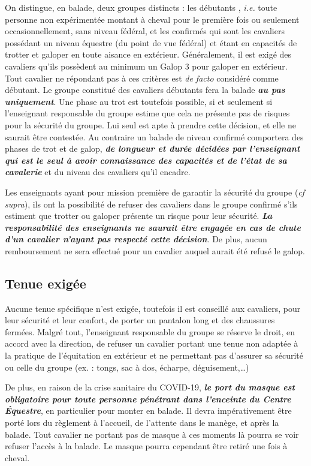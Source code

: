 \documentclass[11pt,a4paper]{article}
\renewcommand{\emph}[1]{\textit{\textbf{#1}}}
\begin{document}
On distingue, en balade, deux groupes distincts : les \og débutants \fg{}, \textit{i.e.} toute personne non expérimentée montant à cheval pour le première fois ou seulement occasionnellement, sans niveau fédéral, et les \og confirmés \fg{} qui sont les cavaliers possédant un niveau équestre (du point de vue fédéral) et étant en capacités de trotter et galoper en toute aisance en extérieur. Généralement, il est exigé des cavaliers qu'ils possèdent au minimum un Galop 3 pour galoper en extérieur. Tout cavalier ne répondant pas à ces critères est \textit{de facto} considéré comme débutant. Le groupe constitué des cavaliers débutants fera la balade \emph{au pas uniquement}. Une phase au trot est toutefois possible, si et seulement si l'enseignant responsable du groupe estime que cela ne présente pas de risques pour la sécurité du groupe. Lui seul est apte à prendre cette décision, et elle ne saurait être contestée. Au contraire un balade de niveau confirmé comportera des phases de trot et de galop, \emph{de longueur et durée décidées par l'enseignant qui est le seul à avoir connaissance des capacités et de l'état de sa cavalerie} et du niveau des cavaliers qu'il encadre.

Les enseignants ayant pour mission première de garantir la sécurité du groupe (\textit{cf supra}), ils ont la possibilité de refuser des cavaliers dans le groupe confirmé s'ils estiment que trotter ou galoper présente un risque pour leur sécurité. \emph{La responsabilité des enseignants ne saurait être engagée en cas de chute d'un cavalier n'ayant pas respecté cette décision}. De plus, aucun remboursement ne sera effectué pour un cavalier auquel aurait été refusé le galop.

\subsection*{Tenue exigée}
Aucune tenue spécifique n'est exigée, toutefois il est conseillé aux cavaliers, pour leur sécurité et leur confort, de porter un pantalon long et des chaussures fermées. Malgré tout, l'enseignant responsable du groupe se réserve le droit, en accord avec la direction, de refuser un cavalier portant une tenue non adaptée à la pratique de l'équitation en extérieur et ne permettant pas d'assurer sa sécurité ou celle du groupe (ex. : tongs, sac à dos, écharpe, déguisement,\dots)

De plus, en raison de la crise sanitaire du COVID-19, \emph{le port du masque est obligatoire pour toute personne pénétrant dans l'enceinte du Centre Équestre}, en particulier pour monter en balade. Il devra impérativement être porté lors du règlement à l'accueil, de l'attente dans le manège, et après la balade. Tout cavalier ne portant pas de masque à ces moments là pourra se voir refuser l'accès à la balade. Le masque pourra cependant être retiré une fois à cheval.
\end{document}
